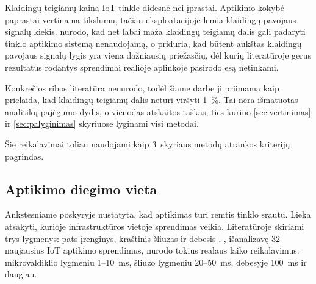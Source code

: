 Klaidingų teigiamų kaina IoT tinkle didesnė nei įprastai.
Aptikimo kokybė paprastai vertinama tikslumu, tačiau eksploatacijoje
lemia klaidingų pavojaus signalų kiekis. \citeauthor{sommer2010closed}
\cite{sommer2010closed} nurodo, kad net labai maža klaidingų teigiamų
dalis gali padaryti tinklo aptikimo sistemą nenaudojamą, o
\citeauthor{reddy2026datasets} \cite{reddy2026datasets} priduria, kad
būtent aukštas klaidingų pavojaus signalų lygis yra viena dažniausių
priežasčių, dėl kurių literatūroje gerus rezultatus rodantys sprendimai
realioje aplinkoje pasirodo esą netinkami.

Konkrečios ribos literatūra nenurodo, todėl šiame darbe ji priimama kaip
prielaida, kad klaidingų teigiamų dalis neturi viršyti 1~\%. Tai nėra
išmatuotas analitikų pajėgumo dydis, o vienodas atskaitos taškas, ties
kuriuo \ref{sec:vertinimas} ir \ref{sec:palyginimas} skyriuose lyginami
visi metodai.

Šie reikalavimai toliau naudojami kaip 3~skyriaus metodų
atrankos kriterijų pagrindas.

\subsection{Aptikimo diegimo vieta}
\label{sec:diegimas}

Ankstesniame poskyryje nustatyta, kad aptikimas turi remtis tinklo
srautu. Lieka atsakyti, kurioje infrastruktūros vietoje sprendimas
veikia. Literatūroje skiriami trys lygmenys: pats įrenginys,
kraštinis šliuzas ir debesis \cite{komal2026idsreview}.
\citeauthor{sallam2026gap} \cite{sallam2026gap}, išanalizavę 32
naujausius IoT aptikimo sprendimus, nurodo tokius realaus laiko
reikalavimus: mikrovaldiklio lygmeniu 1--10~ms, šliuzo lygmeniu
20--50~ms, debesyje 100~ms ir daugiau.

